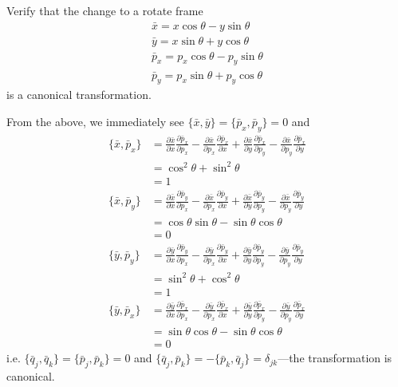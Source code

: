 \documentclass[../principles-of-quantum-mechanics.tex]{subfiles}
\begin{document}
\begin{questions}
		\question Verify that the change to a rotate frame
		\begin{gather*}
			\bar{x} = x\cos\theta - y\sin\theta \\
			\bar{y} = x\sin\theta + y\cos\theta \\
			\bar{p}_x = p_x\cos\theta - p_y\sin\theta \\
			\bar{p}_y = p_x\sin\theta + p_y\cos\theta
		\end{gather*}
		is a canonical transformation.
		
		\begin{solution}
			From the above, we immediately see $\{\bar{x}, \bar{y}\} = \{\bar{p}_x, \bar{p}_y\} = 0$ and
			\begin{align*}
				\{\bar{x}, \bar{p}_x\} &= \frac{\partial\bar{x}}{\partial{x}}\frac{\partial\bar{p}_x}{\partial p_x} - \frac{\partial\bar{x}}{\partial{p_x}}\frac{\partial\bar{p}_x}{\partial x} + \frac{\partial\bar{x}}{\partial{y}}\frac{\partial\bar{p}_x}{\partial p_y} - \frac{\partial\bar{x}}{\partial{p_y}}\frac{\partial\bar{p}_x}{\partial y}  \\
				&= \cos^2\theta + \sin^2\theta \\
				&= 1 \\
				\{\bar{x}, \bar{p}_y\} &= \frac{\partial\bar{x}}{\partial{x}}\frac{\partial\bar{p}_y}{\partial p_x} - \frac{\partial\bar{x}}{\partial{p_x}}\frac{\partial\bar{p}_y}{\partial x} + \frac{\partial\bar{x}}{\partial{y}}\frac{\partial\bar{p}_y}{\partial p_y} - \frac{\partial\bar{x}}{\partial{p_y}}\frac{\partial\bar{p}_y}{\partial y}  \\
				&= \cos\theta\sin\theta - \sin\theta\cos\theta \\
				&= 0 \\
				\{\bar{y}, \bar{p}_y\} &= \frac{\partial\bar{y}}{\partial{x}}\frac{\partial\bar{p}_y}{\partial p_x} - \frac{\partial\bar{y}}{\partial{p_x}}\frac{\partial\bar{p}_y}{\partial x} + \frac{\partial\bar{y}}{\partial{y}}\frac{\partial\bar{p}_y}{\partial p_y} - \frac{\partial\bar{y}}{\partial{p_y}}\frac{\partial\bar{p}_y}{\partial y}  \\
				&= \sin^2\theta + \cos^2\theta \\
				&= 1 \\
				\{\bar{y}, \bar{p}_x\} &= \frac{\partial\bar{y}}{\partial{x}}\frac{\partial\bar{p}_x}{\partial p_x} - \frac{\partial\bar{y}}{\partial{p_x}}\frac{\partial\bar{p}_x}{\partial x} + \frac{\partial\bar{y}}{\partial{y}}\frac{\partial\bar{p}_x}{\partial p_y} - \frac{\partial\bar{y}}{\partial{p_y}}\frac{\partial\bar{p}_x}{\partial y}  \\
				&= \sin\theta\cos\theta - \sin\theta\cos\theta \\
				&= 0
			\end{align*}
			i.e. $\{\bar{q}_j, \bar{q}_k\} = \{\bar{p}_j, \bar{p}_k\} = 0$ and $\{\bar{q}_j, \bar{p}_k\} = -\{\bar{p}_k, \bar{q}_j\} = \delta_{jk}$---the transformation is canonical.
		\end{solution}
		

\end{questions}
\end{document}
